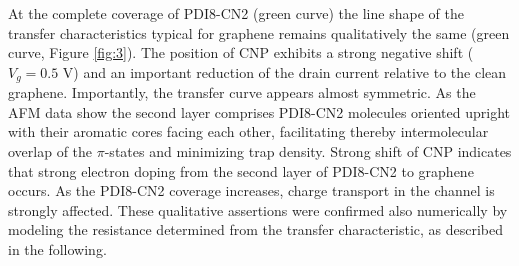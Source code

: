 \documentclass[review]{elsarticle}
\begin{document}
At the complete coverage of PDI8-CN2 (green curve) the line shape of the transfer characteristics typical for graphene remains qualitatively the same (green curve, Figure \ref{fig:3}).
  The position of CNP exhibits a strong negative shift ($V_g=0.5$ V) and an important reduction of the drain current relative to the clean graphene.
 Importantly, the transfer curve appears almost symmetric.
  As the AFM data show the second layer comprises PDI8-CN2 molecules oriented upright with their aromatic cores facing each other, facilitating thereby intermolecular overlap of the $\pi$-states and minimizing trap density.
  Strong shift of CNP indicates that strong electron doping from the second layer of PDI8-CN2 to  graphene occurs.
 As the PDI8-CN2 coverage increases, charge transport in the channel is strongly affected. These qualitative assertions were confirmed also numerically by modeling the resistance determined from the transfer characteristic, as described in the following.
 
\end{document}

